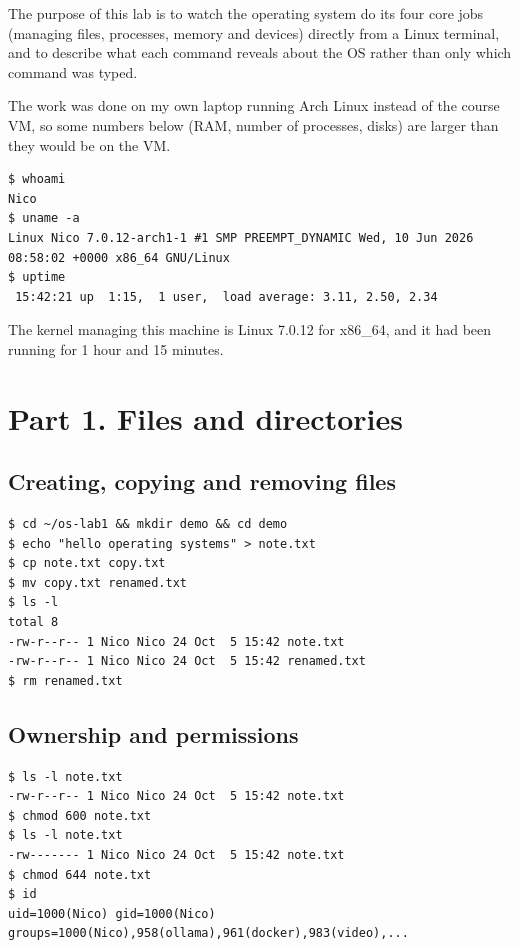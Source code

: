 \documentclass[11pt,a4paper]{article}
\begin{document}
\utmtitlepage
\tableofcontents
\newpage


The purpose of this lab is to watch the operating system do its four core jobs (managing
files, processes, memory and devices) directly from a Linux terminal, and to describe what
each command reveals about the OS rather than only which command was typed.

The work was done on my own laptop running Arch Linux instead of the course VM, so some
numbers below (RAM, number of processes, disks) are larger than they would be on the VM.

\begin{lstlisting}
$ whoami
Nico
$ uname -a
Linux Nico 7.0.12-arch1-1 #1 SMP PREEMPT_DYNAMIC Wed, 10 Jun 2026 08:58:02 +0000 x86_64 GNU/Linux
$ uptime
 15:42:21 up  1:15,  1 user,  load average: 3.11, 2.50, 2.34
\end{lstlisting}

The kernel managing this machine is Linux 7.0.12 for x86\_64, and it had been running for
1 hour and 15 minutes.

\section{Part 1. Files and directories}

\subsection{Creating, copying and removing files}

\begin{lstlisting}
$ cd ~/os-lab1 && mkdir demo && cd demo
$ echo "hello operating systems" > note.txt
$ cp note.txt copy.txt
$ mv copy.txt renamed.txt
$ ls -l
total 8
-rw-r--r-- 1 Nico Nico 24 Oct  5 15:42 note.txt
-rw-r--r-- 1 Nico Nico 24 Oct  5 15:42 renamed.txt
$ rm renamed.txt
\end{lstlisting}

\subsection{Ownership and permissions}

\begin{lstlisting}
$ ls -l note.txt
-rw-r--r-- 1 Nico Nico 24 Oct  5 15:42 note.txt
$ chmod 600 note.txt
$ ls -l note.txt
-rw------- 1 Nico Nico 24 Oct  5 15:42 note.txt
$ chmod 644 note.txt
$ id
uid=1000(Nico) gid=1000(Nico) groups=1000(Nico),958(ollama),961(docker),983(video),...
\end{lstlisting}
\end{document}
